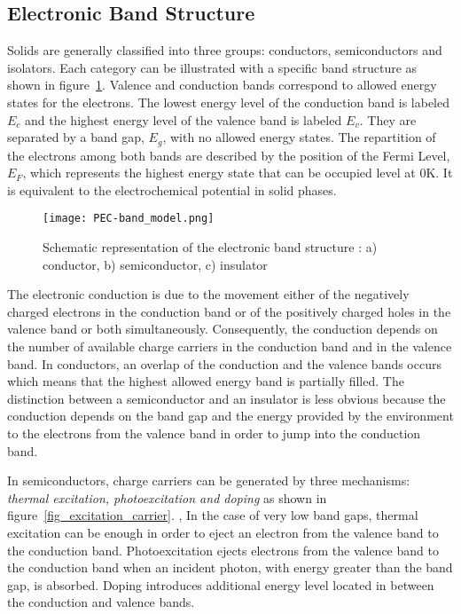 \subsection{Electronic Band Structure}
    Solids are generally classified into three groups: 
    conductors, semiconductors and isolators. 
    Each category can be illustrated with a specific band structure as shown in 
    figure~\ref{fig_band_model}. 
    Valence and conduction bands correspond to allowed energy states for the electrons. 
    The lowest energy level of the conduction band is labeled $E_c$ and the 
    highest energy level of the valence band is labeled $E_v$. 
    They are separated by a band gap, $E_g$, with no allowed energy states. 
    The repartition of the electrons among both bands are described by the position 
    of the Fermi Level, $E_F$, which represents the highest energy state that 
    can be occupied level at 0K. 
    It is equivalent to the electrochemical potential in solid phases.

    \begin{figure}[h]
        \centering
            \texttt{[image: PEC-band\_model.png]}
        \caption{Schematic representation of the electronic band structure \citep{marucco2006}: 
        a) conductor, b) semiconductor, c) insulator}
        \label{fig_band_model}
    \end{figure}

    The electronic conduction is due to the movement either of the negatively 
    charged electrons in the conduction band or of the positively charged holes 
    in the valence band or both simultaneously. 
    Consequently, the conduction depends on the number of available charge carriers
    in the conduction band and in the valence band. 
    In conductors, an overlap of the conduction and the valence bands occurs 
    which means that the highest allowed energy band is partially filled. 
    The distinction between a semiconductor and an insulator is less obvious 
    because the conduction depends on the band gap and the energy provided by 
    the environment to the electrons from the valence band in order to jump 
    into the conduction band.

    In semiconductors, charge carriers can be generated by three mechanisms: 
    \emph{thermal excitation, photoexcitation and doping} as shown in 
    figure~\ref{fig_excitation_carrier}.  , 
    In the case of very low band gaps, thermal excitation can be enough in order 
    to eject an electron from the valence band to the conduction band. 
    Photoexcitation ejects electrons from the valence band to the conduction 
    band when an incident photon, with energy greater than the band gap, is absorbed. 
    Doping introduces additional energy level located in between the conduction and 
    valence bands.

